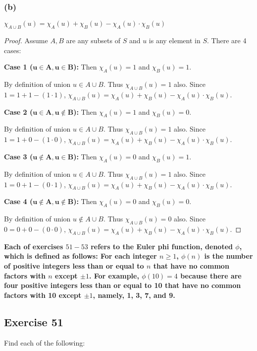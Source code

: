 \documentclass[14pt]{extarticle}
\newcommand{\cy}{\color{cyan}}
\begin{document}
\subsubsection{(b)}
\(\chi_{A \cup B}(u) = \chi_A(u) + \chi_B(u) - \chi_A(u) \cdot \chi_B(u)\)

\begin{proof}
    Assume $A, B$ are any subsets of $S$ and $u$ is any element in $S$. There are 4 cases:

    {\bf Case 1 (\(\bm{u \in A, u \in B}\)):} Then \(\chi_A(u) = 1 \) and \(\chi_B(u) = 1\).

    By definition of union \(u \in A \cup B\). Thus
    \(\chi_{A \cup B}(u) = 1\) also.
    Since $1 = 1 + 1 - (1 \cdot 1)$, \(\chi_{A \cup B}(u) = \chi_A(u) + \chi_B(u) - \chi_A(u) \cdot \chi_B(u)\).

        {\bf Case 2 (\(\bm{u \in A, u \notin B}\)):} Then \(\chi_A(u) = 1\) and \(\chi_B(u) = 0\).

    By definition of union \(u \in A \cup B\). Thus
    \(\chi_{A \cup B}(u) = 1\) also.
    Since $1 = 1 + 0 - (1 \cdot 0)$, \(\chi_{A \cup B}(u) = \chi_A(u) + \chi_B(u) - \chi_A(u) \cdot \chi_B(u)\).

        {\bf Case 3 (\(\bm{u \notin A, u \in B}\)):} Then \(\chi_A(u) = 0\) and \(\chi_B(u) = 1\).

    By definition of union \(u \in A \cup B\). Thus
    \(\chi_{A \cup B}(u) = 1\) also.
    Since $1 = 0 + 1 - (0 \cdot 1)$, \(\chi_{A \cup B}(u) = \chi_A(u) + \chi_B(u) - \chi_A(u) \cdot \chi_B(u)\).

        {\bf Case 4 (\(\bm{u \notin A, u \notin B}\)):} Then \(\chi_A(u) = 0 \) and \(\chi_B(u) = 0\).

    By definition of union \(u \notin A \cup B\). Thus
    \(\chi_{A \cup B}(u) = 0\) also.
    Since $0 = 0 + 0 - (0 \cdot 0)$, \(\chi_{A \cup B}(u) = \chi_A(u) + \chi_B(u) - \chi_A(u) \cdot \chi_B(u)\).
\end{proof}

{\bf \cy Each of exercises $51-53$ refers to the Euler phi function, denoted $\phi$, which is defined as follows: For
each integer \(n \geq 1\), $\phi(n)$ is the number of positive integers less than or equal to $n$ that have no
common factors with $n$ except $\pm 1$. For example, \(\phi(10) = 4\) because there are four positive integers
less than or equal to 10 that have no common factors with 10 except $\pm 1$, namely, 1, 3, 7, and 9.}

\subsection{Exercise 51}
Find each of the following:
\end{document}
